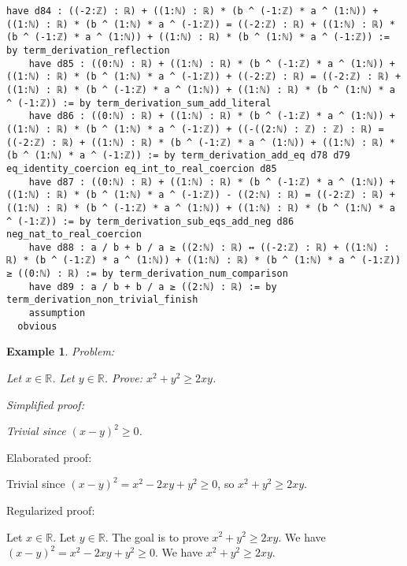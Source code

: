 \documentclass{article}
\newtheorem{example}{Example}
\begin{document}
\begin{tcolorbox}[colback=white!10, width=\linewidth]
\begin{lstlisting}[language=Lean4]
    have d84 : ((-2:ℤ) : ℝ) + ((1:ℕ) : ℝ) * (b ^ (-1:ℤ) * a ^ (1:ℕ)) + ((1:ℕ) : ℝ) * (b ^ (1:ℕ) * a ^ (-1:ℤ)) = ((-2:ℤ) : ℝ) + ((1:ℕ) : ℝ) * (b ^ (-1:ℤ) * a ^ (1:ℕ)) + ((1:ℕ) : ℝ) * (b ^ (1:ℕ) * a ^ (-1:ℤ)) := by term_derivation_reflection
    have d85 : ((0:ℕ) : ℝ) + ((1:ℕ) : ℝ) * (b ^ (-1:ℤ) * a ^ (1:ℕ)) + ((1:ℕ) : ℝ) * (b ^ (1:ℕ) * a ^ (-1:ℤ)) + ((-2:ℤ) : ℝ) = ((-2:ℤ) : ℝ) + ((1:ℕ) : ℝ) * (b ^ (-1:ℤ) * a ^ (1:ℕ)) + ((1:ℕ) : ℝ) * (b ^ (1:ℕ) * a ^ (-1:ℤ)) := by term_derivation_sum_add_literal
    have d86 : ((0:ℕ) : ℝ) + ((1:ℕ) : ℝ) * (b ^ (-1:ℤ) * a ^ (1:ℕ)) + ((1:ℕ) : ℝ) * (b ^ (1:ℕ) * a ^ (-1:ℤ)) + ((-((2:ℕ) : ℤ) : ℤ) : ℝ) = ((-2:ℤ) : ℝ) + ((1:ℕ) : ℝ) * (b ^ (-1:ℤ) * a ^ (1:ℕ)) + ((1:ℕ) : ℝ) * (b ^ (1:ℕ) * a ^ (-1:ℤ)) := by term_derivation_add_eq d78 d79 eq_identity_coercion eq_int_to_real_coercion d85
    have d87 : ((0:ℕ) : ℝ) + ((1:ℕ) : ℝ) * (b ^ (-1:ℤ) * a ^ (1:ℕ)) + ((1:ℕ) : ℝ) * (b ^ (1:ℕ) * a ^ (-1:ℤ)) - ((2:ℕ) : ℝ) = ((-2:ℤ) : ℝ) + ((1:ℕ) : ℝ) * (b ^ (-1:ℤ) * a ^ (1:ℕ)) + ((1:ℕ) : ℝ) * (b ^ (1:ℕ) * a ^ (-1:ℤ)) := by term_derivation_sub_eqs_add_neg d86 neg_nat_to_real_coercion
    have d88 : a / b + b / a ≥ ((2:ℕ) : ℝ) ↔ ((-2:ℤ) : ℝ) + ((1:ℕ) : ℝ) * (b ^ (-1:ℤ) * a ^ (1:ℕ)) + ((1:ℕ) : ℝ) * (b ^ (1:ℕ) * a ^ (-1:ℤ)) ≥ ((0:ℕ) : ℝ) := by term_derivation_num_comparison
    have d89 : a / b + b / a ≥ ((2:ℕ) : ℝ) := by term_derivation_non_trivial_finish
    assumption
  obvious

\end{lstlisting}
\end{tcolorbox}


\begin{example}
Problem:
\begin{tcolorbox}[colback=yellow!10, width=\linewidth]
Let $x\in\mathbb{R}$. Let $y\in\mathbb{R}$.
    Prove: $x^2 + y^2 \ge 2xy$.
\end{tcolorbox}

Simplified proof:
\begin{tcolorbox}[colback=blue!10, width=\linewidth]
Trivial since $(x-y)^2 \ge 0$.
\end{tcolorbox}
\end{example}

Elaborated proof:
\begin{tcolorbox}[colback=green!10, width=\linewidth]
Trivial since $(x-y)^2 = x^2 -2xy + y^2 \ge 0$, so $x^2 + y^2 \ge 2xy$.
\end{tcolorbox}

Regularized proof:
\begin{tcolorbox}[colback=red!10, width=\linewidth]
Let $x\in\mathbb{R}$.
Let $y\in\mathbb{R}$.
The goal is to prove $x^2 + y^2 \ge 2xy$.
We have ${{(x-y)}}^2 = x^2 -2xy + y^2 \ge 0$.
We have $x^2 + y^2 \ge 2xy$.
\end{tcolorbox}
\end{document}
